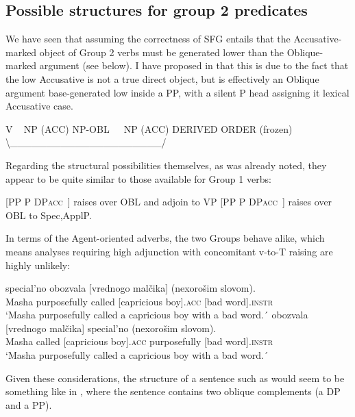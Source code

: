 \documentclass[output=paper,colorlinks,citecolor=brown,nonflat]{./langscibook}
\begin{document}
\subsection{Possible structures for group 2 predicates}\label{sec:antonyuk:4.2}

We have seen that assuming the correctness of SFG entails that the Accusative-marked object of Group 2 verbs must be generated lower than the Oblique-marked argument (see  below). I have proposed in \citet{Antonyuk2015} that this is due to the fact that the low Accusative is not a true direct object, but is effectively an Oblique argument base-generated low inside a PP, with a silent P head assigning it lexical Accusative case. 

\ea%
    \label{ex:antonyuk:49}
    V ~ NP (ACC) NP-OBL~~~NP (ACC)  DERIVED ORDER (frozen)  ~                               {\textbackslash}\_\_\_\_\_\_\_\_\_\_\_\_\_\_\_\_\_\_\_\_\_/
    \z

Regarding the structural possibilities themselves, as was already noted, they appear to be quite similar to those available for Group 1 verbs:


\ea%
    \label{ex:antonyuk:50}
    \ea \label{ex:antonyuk:50a}{}
    [PP P DP\textsc{acc~}] raises over OBL and adjoin to VP
    \ex \label{ex:antonyuk:50b}{}
    [PP P DP\textsc{acc~]} raises over OBL to Spec,ApplP.
    \z
\z

In terms of the Agent-oriented adverbs, the two Groups behave alike, which means analyses requiring high adjunction with concomitant v-to-T raising are highly unlikely:

\ea%
    \label{ex:antonyuk:51}
    \ea \label{ex:antonyuk:51a}
       {special’no}    {obozvala} {[vrednogo}  {malčika]} {(nexorošim} {slovom)}.\\
    Masha purposefully called      [capricious boy].\textsc{acc} [bad word].\textsc{instr}\\
    \glt `Masha purposefully called a capricious boy with a bad word.´
    \ex \label{ex:antonyuk:51b}
      {obozvala} {[vrednogo} {malčika]}  {special’no}      {(nexorošim} {slovom)}.\\
    Masha called     [capricious boy].\textsc{acc} purposefully  [bad word].\textsc{instr}\\
    \glt `Masha purposefully called a capricious boy with a bad word.´
    \z
\z

Given these considerations, the structure of a sentence such as  would seem to be something like in , where the sentence contains two oblique complements (a DP and a PP).
\end{document}
